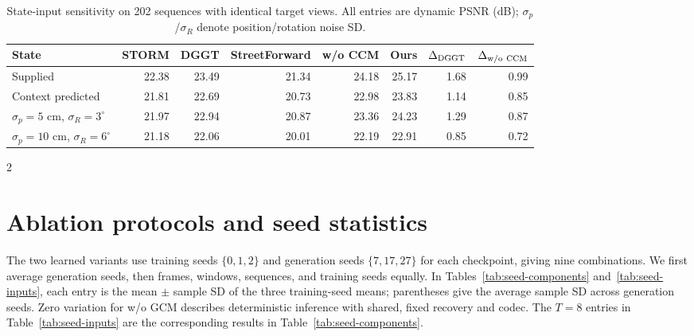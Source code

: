 \begin{table}[H]
\centering\small
\setlength{\tabcolsep}{3pt}
\caption{State-input sensitivity on 202 sequences with identical target views. All entries are dynamic PSNR (dB); $\sigma_p$/$\sigma_R$ denote position/rotation noise SD.}
\label{tab:state-sensitivity}
\begin{tabular}{@{}lrrrrrrr@{}}
\toprule
State & STORM & DGGT & StreetForward & w/o CCM & Ours & $\Delta_{\rm DGGT}$ & $\Delta_{\rm w/o\ CCM}$ \\
\midrule
Supplied & 22.38 & 23.49 & 21.34 & 24.18 & 25.17 & 1.68 & 0.99 \\
Context predicted & 21.81 & 22.69 & 20.73 & 22.98 & 23.83 & 1.14 & 0.85 \\
$\sigma_p=5$ cm, $\sigma_R=3^\circ$ & 21.97 & 22.94 & 20.87 & 23.36 & 24.23 & 1.29 & 0.87 \\
$\sigma_p=10$ cm, $\sigma_R=6^\circ$ & 21.18 & 22.06 & 20.01 & 22.19 & 22.91 & 0.85 & 0.72 \\
\bottomrule
\end{tabular}
\end{table}
\begin{multicols}{2}

\section{Ablation protocols and seed statistics}
\label{sec:supp-ablations}

The two learned variants use training seeds $\{0,1,2\}$ and generation seeds $\{7,17,27\}$ for each checkpoint, giving nine combinations. We first average generation seeds, then frames, windows, sequences, and training seeds equally. In Tables~\ref{tab:seed-components} and~\ref{tab:seed-inputs}, each entry is the mean $\pm$ sample SD of the three training-seed means; parentheses give the average sample SD across generation seeds. Zero variation for w/o GCM describes deterministic inference with shared, fixed recovery and codec. The $T=8$ entries in Table~\ref{tab:seed-inputs} are the corresponding results in Table~\ref{tab:seed-components}.

\end{multicols}
